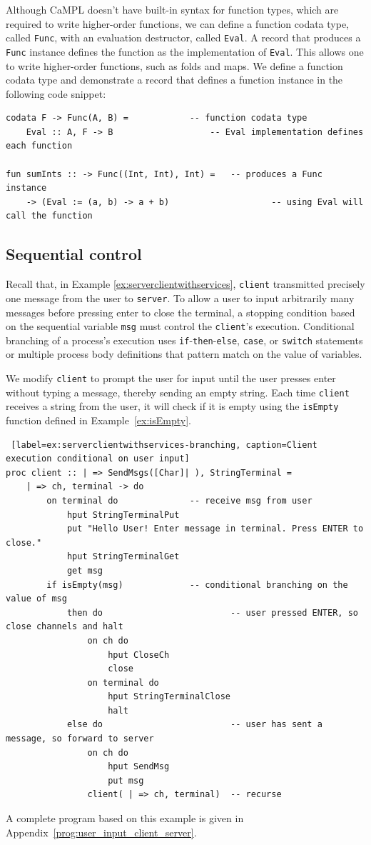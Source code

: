 \documentclass[11pt]{article}
\begin{document}
Although CaMPL doesn't have built-in syntax for function types, which are required to write higher-order functions, we can define a function codata type, called \lstinline{Func}, with an evaluation destructor, called \lstinline{Eval}.
A record that produces a \lstinline{Func} instance defines the function as the implementation of \lstinline{Eval}.
This allows one to write higher-order functions, such as folds and maps.
We define a function codata type and demonstrate a record that defines a function instance in the following code snippet:
\begin{lstlisting}
codata F -> Func(A, B) =			-- function codata type
	Eval :: A, F -> B 					-- Eval implementation defines each function

fun sumInts :: -> Func((Int, Int), Int) =	-- produces a Func instance
    -> (Eval := (a, b) -> a + b)					-- using Eval will call the function
\end{lstlisting}


\subsection{Sequential control}
\label{sec:seqcontrol}

Recall that, in Example \ref{ex:serverclientwithservices}, \lstinline$client$  transmitted precisely one message from the user to \lstinline$server$.
To allow a user to input arbitrarily many messages before pressing enter to close the terminal, a stopping condition based on the sequential variable \lstinline{msg} must control the \lstinline$client$'s execution.
Conditional branching of a process's execution uses \lstinline$if$-\lstinline$then$-\lstinline$else$, \lstinline$case$, or \lstinline$switch$ statements or multiple process body definitions that pattern match on the value of variables. 

We modify \lstinline$client$ to prompt the user for input until the user presses enter without typing a message, thereby sending an empty string.
Each time \lstinline$client$ receives a string from the user, it will check if it is empty using the \lstinline$isEmpty$ function defined in Example~\ref{ex:isEmpty}.
\begin{lstlisting} [label=ex:serverclientwithservices-branching, caption=Client execution conditional on user input] 
proc client :: | => SendMsgs([Char]| ), StringTerminal =
	| => ch, terminal -> do
		on terminal do				-- receive msg from user
			hput StringTerminalPut
			put "Hello User! Enter message in terminal. Press ENTER to close."
			hput StringTerminalGet
			get msg
		if isEmpty(msg)				-- conditional branching on the value of msg
			then do							-- user pressed ENTER, so close channels and halt
				on ch do 
					hput CloseCh
					close 
				on terminal do
					hput StringTerminalClose	
					halt 
			else do							-- user has sent a message, so forward to server
				on ch do											
					hput SendMsg
					put msg
				client( | => ch, terminal)	-- recurse 
\end{lstlisting}   
A complete program based on this example is given in Appendix~\ref{prog:user_input_client_server}.
\end{document}
